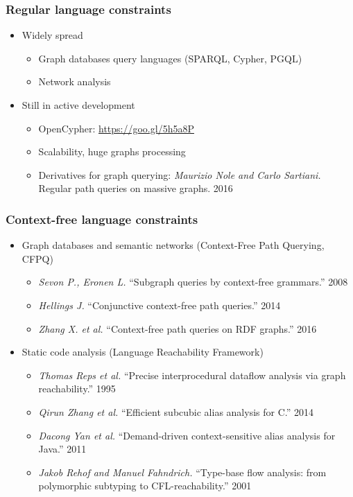 \documentclass[xcolor=table,aspectratio=169]{beamer}
\begin{document}
\begin{frame}[fragile]
  \transwipe[direction=90]
  \frametitle{Regular language constraints}
  \begin{itemize}
   \item Widely spread
    \begin{itemize}
      \item Graph databases query languages (SPARQL, Cypher, PGQL)
	  \item Network analysis
    \end{itemize}  
	\item Still in active development
	\begin{itemize}
      \item OpenCypher: \url{https://goo.gl/5h5a8P}
	  \item Scalability, huge graphs processing
	  \item Derivatives for graph querying: \emph{Maurizio Nole and Carlo Sartiani.} Regular path queries on massive graphs. 2016
    \end{itemize}  	
  \end{itemize}
\end{frame}


\begin{frame}[fragile]
  \transwipe[direction=90]
  \frametitle{Context-free language constraints}
  \begin{itemize}
  \item Graph databases and semantic networks (Context-Free Path Querying, CFPQ)
    \begin{itemize}
        \item \emph{Sevon P., Eronen L.} ``Subgraph queries by context-free grammars.'' 2008
        \item \emph{Hellings J.} ``Conjunctive context-free path queries.'' 2014
        \item \emph{Zhang X. et al.} ``Context-free path queries on RDF graphs.'' 2016
    \end{itemize}
    \item Static code analysis (Language Reachability Framework)
    \begin{itemize}
        \item \emph{Thomas Reps et al.} ``Precise interprocedural dataflow analysis via graph reachability.'' 1995 
        \item \emph{Qirun Zhang et al.}  ``Efficient subcubic alias analysis for C.'' 2014
        \item \emph{Dacong Yan et al.} ``Demand-driven context-sensitive alias analysis for Java.'' 2011
        \item \emph{Jakob Rehof and Manuel Fahndrich.} ``Type-base flow analysis: from polymorphic subtyping to CFL-reachability.'' 2001
    \end{itemize}
  \end{itemize}
\end{frame}
\end{document}
